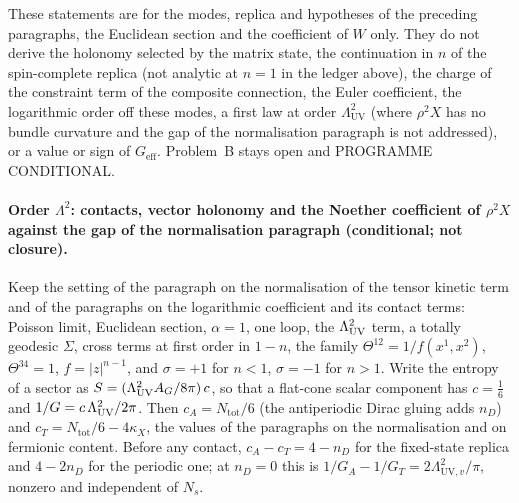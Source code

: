 These statements are for the modes, replica and hypotheses of the preceding paragraphs, the Euclidean section and the coefficient of \(W\) only. They do not derive the holonomy selected by the matrix state, the continuation in \(n\) of the spin-complete replica (not analytic at \(n=1\) in the ledger above), the charge of the constraint term of the composite connection, the Euler coefficient, the logarithmic order off these modes, a first law at order \(\Lambda_{\mathrm{UV}}^2\) (where \(\rho^2X\) has no bundle curvature and the gap of the normalisation paragraph is not addressed), or a value or sign of \(G_{\mathrm{eff}}\). Problem~B stays open and PROGRAMME CONDITIONAL.

\paragraph{Order \(\Lambda^2\): contacts, vector holonomy and the Noether coefficient of \(\rho^2X\) against the gap of the normalisation paragraph (conditional; not closure).}
Keep the setting of the paragraph on the normalisation of the tensor kinetic term and of the paragraphs on the logarithmic coefficient and its contact terms: Poisson limit, Euclidean section, \(\alpha=1\), one loop, the \(\Lambda_{\mathrm{UV}}^2\) term, a totally geodesic \(\Sigma\), cross terms at first order in \(1-n\), the family \(\Theta^{12}=1/f(x^1,x^2)\), \(\Theta^{34}=1\), \(f=\lvert z\rvert^{n-1}\), and \(\sigma=+1\) for \(n<1\), \(\sigma=-1\) for \(n>1\). Write the entropy of a sector as \(S=(\Lambda_{\mathrm{UV}}^2A_G/8\pi)\,c\), so that a flat-cone scalar component has \(c=\tfrac16\) and \(1/G=c\,\Lambda_{\mathrm{UV}}^2/2\pi\). Then \(c_A=N_{\mathrm{tot}}/6\) (the antiperiodic Dirac gluing adds \(n_D\)) and \(c_T=N_{\mathrm{tot}}/6-4\kappa_X\), the values of the paragraphs on the normalisation and on fermionic content. Before any contact, \(c_A-c_T=4-n_D\) for the fixed-state replica and \(4-2n_D\) for the periodic one; at \(n_D=0\) this is \(1/G_A-1/G_T=2\Lambda_{\mathrm{UV},v}^2/\pi\), nonzero and independent of \(N_s\).

